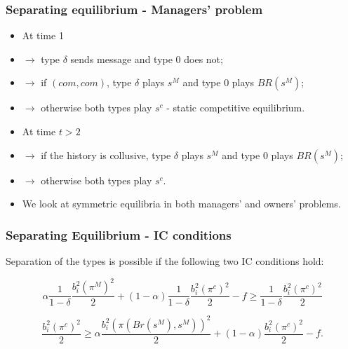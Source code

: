 \documentclass[xcolor=dvipsnames]{beamer}
\begin{document}
\begin{frame}
\frametitle{Separating equilibrium - Managers' problem}
	\begin{itemize}
		\item At time 1
		\item[] $\rightarrow$ type $\delta$ sends message and type $0$ does not;
		
		\item[] $\rightarrow$ if $(com,com)$, type $\delta$ plays $s^M$ and type $0$ plays $BR(s^M)$; 
		
		\item[] $\rightarrow$ otherwise both types play $s^c$ - static competitive equilibrium.
		
		\bigskip
		
		\item At time $t>2$
		
		\item[] $\rightarrow$ if the history is collusive, type $\delta$ plays $s^M$ and type $0$ plays $BR(s^M)$;
		
		\item[] $\rightarrow$ otherwise both types play $s^c$.
		
		\bigskip
		
		\item We look at symmetric equilibria in both managers' and owners' problems.
	\end{itemize}
\end{frame}

\begin{frame}
\frametitle{Separating Equilibrium - IC conditions}
Separation of the types is possible if the following two IC conditions hold:

\begin{equation*}\label{IC-type-delta}
\alpha \frac{1}{1-\delta} \frac{b_i^2 (\pi^M)^2}{2} + (1-\alpha) \frac{1}{1-\delta} \frac{b_i^2 (\pi^c)^2}{2} - f \geq \frac{1}{1-\delta} \frac{b_i^2 (\pi^c)^2}{2}
\end{equation*}

\bigskip

\bigskip

\begin{equation*}\label{IC-type-0}
\frac{b_i^2 (\pi^c)^2}{2}  \geq \alpha \frac{b_i^2 (\pi(Br(s^M),s^M))^2}{2} + (1-\alpha) \frac{b_i^2 (\pi^c)^2}{2} - f.
\end{equation*}
\end{frame}
\end{document}
